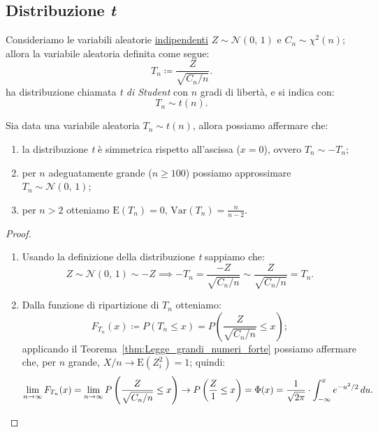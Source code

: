         \subsection{Distribuzione \emph{t}}
            \begin{defn}
                Consideriamo le variabili aleatorie \underline{indipendenti} $Z \sim \mathcal{N}(0,\,1)$ e $C_n \sim \chi^2(n)$; allora la variabile aleatoria definita come segue:
                \begin{equation}\label{eq:Distribuzione_t}
                    T_n \coloneqq \frac{Z}{\sqrt{C_n /n}}
                .\end{equation}
                ha distribuzione chiamata \emph{t di Student} con $n$ gradi di libertà, e si indica con: \[
                    T_n \sim t(n)
            .\]
            \end{defn}
            \begin{prty}\label{prty:Distribuzione_t}
                Sia data una variabile aleatoria $T_n \sim t(n)$, allora possiamo affermare che:
                \begin{enumerate}
                    \item la distribuzione \emph{t} è simmetrica rispetto all'ascissa ($x=0$), ovvero $T_n \sim -T_n$;
                    \item per $n$ adeguatamente grande ($n \geq 100$) possiamo approssimare $T_n \sim \mathcal{N}(0,\,1)$;
                    \item per $n>2$ otteniamo $\text{E}(T_n)=0,\, \text{Var}(T_n)=\frac{n}{n-2}$.
                \end{enumerate}
            \end{prty}
            \begin{proof}
                \hfill
                \begin{enumerate}
                    \item Usando la definizione della distribuzione \emph{t} sappiamo che: \[
                        Z \sim \mathcal{N}(0,\,1) \sim -Z \implies
                        -T_n = \frac{-Z}{\sqrt{C_n /n}} \sim \frac{Z}{\sqrt{C_n /n}} = T_n
                    .\] 
                    \item Dalla funzione di ripartizione di $T_n$ otteniamo: \[
                            F_{T_n}(x) \coloneqq P(T_n \leq x) = P\left(\frac{Z}{\sqrt{C_n /n}} \leq x\right)
                        ;\] applicando il Teorema~\ref{thm:Legge_grandi_numeri_forte} possiamo affermare che, per $n$ grande, $X /n \rightarrow \text{E}(Z_i^2)=1$; quindi: \[
                        \lim_{n \to \infty} F_{T_n}(x) = 
                        \lim_{n \to \infty} P\left(\frac{Z}{\sqrt{C_n /n}} \leq x\right) \rightarrow
                        P\left(\frac{Z}{1} \leq x\right) = \Phi(x) = \frac{1}{\sqrt{2\pi}} \cdot \int_{-\infty}^{x} e^{-u^2 /2}\, du
                        .\qedhere\]
                \end{enumerate}
            \end{proof}
